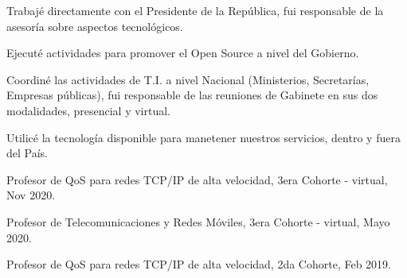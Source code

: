 \documentclass[]{plushcv}
\begin{document}
\begin{minipage}[t]{0.70\textwidth}
\begin{tightemize}
\sectionsep
\item Trabajé directamente con el Presidente de la República, fui responsable de la asesoría sobre aspectos tecnológicos.
\item Ejecuté actividades para promover el Open Source a nivel del Gobierno.
\item Coordiné las actividades de T.I. a nivel Nacional (Ministerios, Secretarías, Empresas públicas), fui responsable de las reuniones de Gabinete en sus dos modalidades, presencial y virtual.
\item Utilicé la tecnología disponible para manetener nuestros servicios, dentro y fuera del País.
\end{tightemize}
\sectionsep

\vspace{\topsep} %
\begin{tightemize}
	\sectionsep
	\item Profesor de QoS para redes TCP/IP de alta velocidad, 3era Cohorte - virtual, Nov 2020.
	\item Profesor de Telecomunicaciones y Redes Móviles, 3era Cohorte - virtual, Mayo 2020.
	\item Profesor de QoS para redes TCP/IP de alta velocidad, 2da Cohorte, Feb 2019.
\end{tightemize}
\sectionsep


%
%

\end{minipage} 
\end{document}
